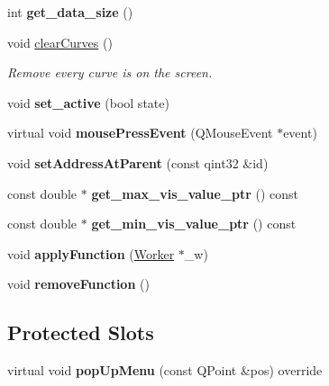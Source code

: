 \begin{DoxyCompactItemize}
int {\bfseries get\+\_\+data\+\_\+size} ()
\item 
\mbox{\label{classdisplay__screen_a85b97edfde46cbe8136877c35bb6876d}} 
void \mbox{\hyperlink{classdisplay__screen_a85b97edfde46cbe8136877c35bb6876d}{clear\+Curves}} ()
\begin{DoxyCompactList}\small\item\em Remove every curve is on the screen. \end{DoxyCompactList}\item 
\mbox{\label{classdisplay__screen_ac2ef804e167c1ba941dcf91134bbe769}} 
void {\bfseries set\+\_\+active} (bool state)
\item 
\mbox{\label{classdisplay__screen_ac64b0a65402d794e135c6c6e189d02a6}} 
virtual void {\bfseries mouse\+Press\+Event} (Q\+Mouse\+Event $\ast$event)
\item 
\mbox{\label{classdisplay__screen_ab54ec0811e324d192a75b3e538c66513}} 
void {\bfseries set\+Address\+At\+Parent} (const qint32 \&id)
\item 
\mbox{\label{classdisplay__screen_a1a0a574c59e0c4cfd8ad8de4bb8e105d}} 
const double $\ast$ {\bfseries get\+\_\+max\+\_\+vis\+\_\+value\+\_\+ptr} () const
\item 
\mbox{\label{classdisplay__screen_a8e8a2009db3859562e3d52e44731dd03}} 
const double $\ast$ {\bfseries get\+\_\+min\+\_\+vis\+\_\+value\+\_\+ptr} () const
\item 
\mbox{\label{classdisplay__screen_a17b159563b62a3c8bfd7245453ba421a}} 
void {\bfseries apply\+Function} (\mbox{\hyperlink{classWorker}{Worker}} $\ast$\+\_\+w)
\item 
\mbox{\label{classdisplay__screen_a2df277a3abd63d90ec1ead11d0eb3818}} 
void {\bfseries remove\+Function} ()
\end{DoxyCompactItemize}
\subsection*{Protected Slots}
\begin{DoxyCompactItemize}
\item 
\mbox{\label{classdisplay__screen__raster_ada409c22c06e97a72216609aa7ff34b9}} 
virtual void {\bfseries pop\+Up\+Menu} (const Q\+Point \&pos) override
\end{DoxyCompactItemize}
